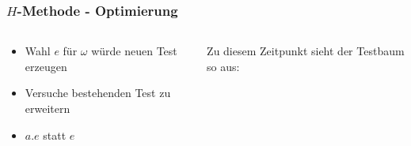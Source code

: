 \documentclass[10pt]{beamer}
\begin{document}
\begin{frame}
  \frametitle{$H$-Methode - Optimierung}
  \begin{columns}[T] %

\begin{column}{.4\textwidth}
  \begin{itemize}
	\item<2->Wahl $e$ für $\omega$ würde neuen Test erzeugen
	\item<3->Versuche bestehenden Test zu erweitern
	\item<4->$a.e$ statt $e$
  \end{itemize}
\end{column}%

\begin{column}{.70\textwidth}
Zu diesem Zeitpunkt sieht der Testbaum so aus:

\end{column}
\end{columns}
\end{frame}
\end{document}
